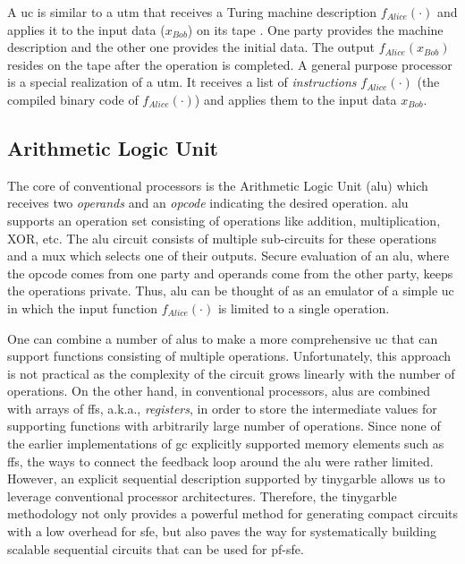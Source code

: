 A \acrshort{uc} is similar to a \acrfull{utm} \cite{turing1936computable,herken1995universal} that receives a Turing machine description $f_{Alice}(\cdot)$ and applies it to the input data ($x_{Bob}$) on its tape \cite{davis2001engines}.
One party provides the machine description and the other one provides the initial data.
The output $f_{Alice}(x_{Bob})$ resides on the tape after the operation is completed.
A general purpose processor is a special realization of a \acrshort{utm}.
It receives a list of \emph{instructions} $f_{Alice}(\cdot)$ (the compiled binary code of $f_{Alice}(\cdot)$) and applies them to the input data $x_{Bob}$.

\subsection{Arithmetic Logic Unit}\label{ssec:processor-alu}
The core of conventional processors is the Arithmetic Logic Unit (\acrshort{alu}) which receives two \emph{operands} and an \emph{opcode} indicating the desired operation.
\acrshort{alu} supports an operation set consisting of operations like addition, multiplication, XOR, etc.
The \acrshort{alu} circuit consists of multiple sub-circuits for these operations and a \acrshort{mux} which selects one of their outputs.
Secure evaluation of an \acrshort{alu}, where the opcode comes from one party and operands come from the other party, keeps the operations private.
Thus, \acrshort{alu} can be thought of as an emulator of a simple \acrshort{uc} in which the input function $f_{Alice}(\cdot)$ is limited to a single operation.

One can combine a number of \acrshort{alu}s to make a more comprehensive \acrshort{uc} that can support functions consisting of multiple operations.
Unfortunately, this approach is not practical as the complexity of the circuit grows linearly with the number of operations.
On the other hand, in conventional processors, \acrshort{alu}s are combined with arrays of \acrshort{ff}s, a.k.a., \emph{registers}, in order to store the intermediate values for supporting functions with arbitrarily large number of operations.
Since none of the earlier implementations of \acrshort{gc} explicitly supported memory elements such as \acrshort{ff}s, the ways to connect the feedback loop around the \acrshort{alu} were rather limited.
However, an explicit sequential description supported by \gls{tinygarble} allows us to leverage conventional processor architectures.
Therefore, the \gls{tinygarble} methodology not only provides a powerful method for generating compact circuits with a low overhead for \acrshort{sfe}, but also paves the way for systematically building scalable sequential circuits that can be used for \acrshort{pf-sfe}.

